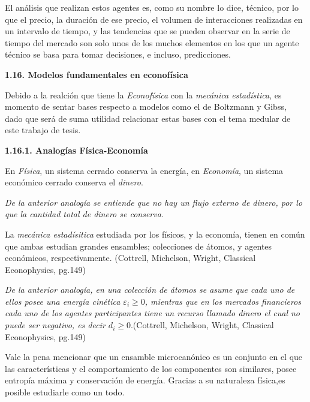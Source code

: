 El análisis que realizan estos agentes es, como su nombre lo dice, técnico, por lo que el precio, la duración de ese precio, el volumen de interacciones realizadas en un intervalo de tiempo, y las tendencias que se pueden observar en la serie de tiempo del mercado son solo unos de los muchos elementos en los que un agente técnico se basa para tomar decisiones, e incluso, predicciones.
\newline

{
\Large  \textbf{1.16. Modelos fundamentales en econofísica} 
}

Debido a la realción que tiene la \textit{Econofísica} con la \textit{mecánica estadística}, es momento de sentar bases respecto a modelos como el de Boltzmann y Gibss, dado que será de suma utilidad relacionar estas bases con el tema medular de este trabajo de tesis.
\newline
\vspace{0.5cm}

{
\Large  \textbf{1.16.1. Analogías Física-Economía} 
}

En \textit{Física}, un sistema cerrado conserva la energía,  en \textit{Economía}, un sistema económico cerrado conserva el \textit{dinero}. \newline

\textit{De la anterior analogía se entiende que no hay un flujo externo de dinero, por lo que la cantidad total de dinero se conserva}.

La \textit{mecánica estadísitica} estudiada por los físicos, y la economía, tienen en común que ambas estudian grandes ensambles; colecciones de átomos, y agentes económicos, respectivamente.
(Cottrell, Michelson, Wright, Classical Econophysics, pg.149)

\textit{De la anterior analogía, en una colección de átomos se asume que cada uno de ellos posee una energía cinética $\mathit{\varepsilon}_{i} \geqslant 0 $, mientras que en los mercados financieros cada uno de los agentes participantes tiene un recurso llamado dinero el cual no puede ser negativo, es decir  $\mathit{d}_{i} \geqslant 0 $}.(Cottrell, Michelson, Wright, Classical Econophysics, pg.149)

Vale la pena mencionar que un ensamble microcanónico es un conjunto  en el que las características y el comportamiento de los componentes son similares, posee entropía máxima y conservación de energía. Gracias a su naturaleza física,es posible estudiarle como un todo.  
\vspace{0.5cm}

